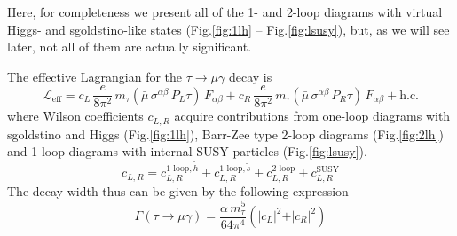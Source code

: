 \documentclass[10pt]{article}
\begin{document}
\noindent
Here, for completeness we present all of the 1- and 2-loop diagrams with virtual Higgs- and sgoldstino-like states (Fig.\ref{fig:1lh} -- Fig.\ref{fig:lsusy}), but, as we will see later, not all of them are actually significant.

\noindent
The effective Lagrangian for the $\tau \rightarrow \mu \gamma$ decay is
\begin{equation}
\label{Lefftmg}
\mathcal{L}_{\text{eff}} = c_L \, \frac{e}{8\pi^2} \, m_{\tau} (\bar{\mu}\, \sigma^{\alpha \beta} \, P_L \tau) \, F_{\alpha \beta} + c_R \,  \frac{e}{8\pi^2} \, m_{\tau} (\bar{\mu} \, \sigma^{\alpha \beta} \, P_R \tau) \, F_{\alpha \beta} +\text{h.c.}
\end{equation}
where Wilson coefficients $c_{L,R}$ acquire contributions from one-loop diagrams with sgoldstino and Higgs (Fig.\ref{fig:1lh}), Barr-Zee type 2-loop diagrams (Fig.\ref{fig:2lh}) and 1-loop diagrams with internal SUSY particles (Fig.\ref{fig:lsusy}).
\begin{equation}
\label{WilsonC}
c_{L,R} = c_{L,R}^{\text{1-loop},\tilde{h}}+c_{L,R}^{\text{1-loop},\tilde{s}}+c_{L,R}^{\text{2-loop}}+c_{L,R}^{\text{SUSY}}
\end{equation}
The decay width thus can be given by the following expression
\begin{equation}
\label{tmgWidth}
\Gamma(\tau \rightarrow \mu \gamma) = \frac{\alpha \, m_{\tau}^5}{64 \pi^4} (\vert c_L \vert^2+\vert c_R \vert^2)
\end{equation}
\end{document}
